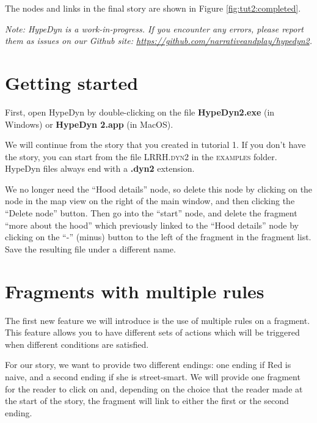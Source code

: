 \documentclass{article}
\begin{document}
The nodes and links in the final story are shown in Figure \ref{fig:tut2:completed}.

\textit{Note:  HypeDyn is a work-in-progress. If you encounter any errors, please report them as issues on our Github site: \url{https://github.com/narrativeandplay/hypedyn2}.}

\section{Getting started}

First, open HypeDyn by double-clicking on the file \textbf{HypeDyn2.exe} (in Windows) or \textbf{HypeDyn 2.app} (in MacOS).

We will continue from the story that you created in tutorial 1. If you don't have the story, you can start from the file \textsc{LRRH.dyn2} in the \textsc{examples} folder. HypeDyn files always end with a \textbf{.dyn2} extension.


We no longer need the ``Hood details'' node, so delete this node by clicking on the node in the map view on the right of the main window, and then clicking the ``Delete node'' button. Then go into the ``start'' node, and delete the fragment ``more about the hood'' which previously linked to the ``Hood details'' node by clicking on the ``-'' (minus) button to the left of the fragment in the fragment list. Save the resulting file under a different name.

\section{Fragments with multiple rules}

The first new feature we will introduce is the use of multiple rules on a fragment. This feature allows you to have different sets of actions which will be triggered when different conditions are satisfied.

For our story, we want to provide two different endings: one ending if Red is naive, and a second ending if she is street-smart. We will provide one fragment for the reader to click on and, depending on the choice that the reader made at the start of the story, the fragment will link to either the first or the second ending.
\end{document}
